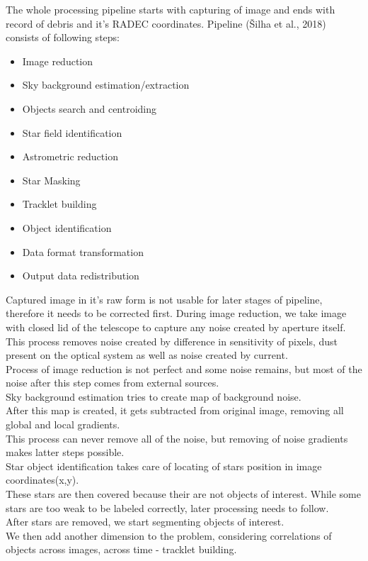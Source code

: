 \documentclass[12pt, a4paper, oneside]{book}
\begin{document}
The whole processing pipeline starts with capturing of image and ends with record of debris and it's RADEC coordinates.
Pipeline (Šilha et al., 2018) consists of following steps:
\begin{itemize}
    \item{Image reduction}
    \item{Sky background estimation/extraction}
    \item{Objects search and centroiding}
    \item{Star field identification}
    \item{Astrometric reduction}
    \item{Star Masking}
    \item{Tracklet building}
    \item{Object identification}
    \item{Data format transformation}
    \item{Output data redistribution}
\end{itemize}
\par
\indent
Captured image in it's raw form is not usable for later stages of pipeline, therefore it needs to be corrected first.
During image reduction, we take image with closed lid of the telescope to capture any noise created by aperture itself.
This process removes noise created by difference in sensitivity of pixels, dust present on the optical system as well as noise created by current.\\
\indent
Process of image reduction is not perfect and some noise remains, but most of the noise after this step comes from external sources.\\
\indent
Sky background estimation tries to create map of background noise.\\
After this map is created, it gets subtracted from original image, removing all global and local gradients.\\
This process can never remove all of the noise, but removing of noise gradients makes latter steps possible.\\
\indent
Star object identification takes care of locating of stars position in image coordinates(x,y).\\
These stars are then covered because their are not objects of interest.
While some stars are too weak to be labeled correctly, later processing needs to follow.\\
\indent
After stars are removed, we start segmenting objects of interest.\\
We then add another dimension to the problem, considering correlations of objects across images, across time - tracklet building.\\
\end{document}
